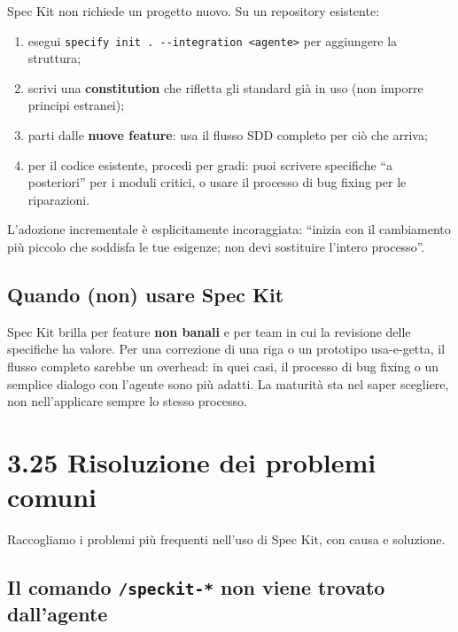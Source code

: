 \documentclass[
  italian,
  10pt,
]{book}
\providecommand{\tightlist}{%
  \setlength{\itemsep}{0pt}\setlength{\parskip}{0pt}}
\begin{document}
Spec Kit non richiede un progetto nuovo. Su un repository esistente:

\begin{enumerate}
\def\labelenumi{\arabic{enumi}.}
\tightlist
\item
  esegui
  \texttt{specify\ init\ .\ -\/-integration\ \textless{}agente\textgreater{}}
  per aggiungere la struttura;
\item
  scrivi una \textbf{constitution} che rifletta gli standard già in uso
  (non imporre principi estranei);
\item
  parti dalle \textbf{nuove feature}: usa il flusso SDD completo per ciò
  che arriva;
\item
  per il codice esistente, procedi per gradi: puoi scrivere specifiche
  ``a posteriori'' per i moduli critici, o usare il processo di bug
  fixing per le riparazioni.
\end{enumerate}

L'adozione incrementale è esplicitamente incoraggiata: ``inizia con il
cambiamento più piccolo che soddisfa le tue esigenze; non devi
sostituire l'intero processo''.

\subsection{Quando (non) usare Spec
Kit}\label{quando-non-usare-spec-kit}

Spec Kit brilla per feature \textbf{non banali} e per team in cui la
revisione delle specifiche ha valore. Per una correzione di una riga o
un prototipo usa-e-getta, il flusso completo sarebbe un overhead: in
quei casi, il processo di bug fixing o un semplice dialogo con l'agente
sono più adatti. La maturità sta nel saper scegliere, non nell'applicare
sempre lo stesso processo.

\section{3.25 Risoluzione dei problemi
comuni}\label{risoluzione-dei-problemi-comuni-1}

Raccogliamo i problemi più frequenti nell'uso di Spec Kit, con causa e
soluzione.

\subsection{\texorpdfstring{Il comando \texttt{/speckit-*} non viene
trovato
dall'agente}{Il comando /speckit-* non viene trovato dall'agente}}\label{il-comando-speckit--non-viene-trovato-dallagente}
\end{document}

